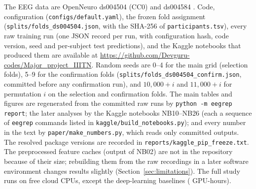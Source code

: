 \begin{sloppypar}
The EEG data are OpenNeuro ds004504 (CC0) \cite{ds004504} and ds004584 \cite{ds004584}. Code, configuration
(\texttt{configs/default.yaml}), the frozen fold assignment (\texttt{splits/folds\_ds004504.json},
with the SHA-256 of \texttt{participants.tsv}), every raw training run (one JSON record per run,
with configuration hash, code version, seed and per-subject test predictions), and the Kaggle
notebooks that produced them are available at
\url{https://github.com/Devguru-codes/Major_project_IIITN}. Random seeds are 0--4 for the main grid
(selection folds), 5--9 for the confirmation folds (\texttt{splits/folds\_ds004504\_confirm.json},
committed before any confirmation run), and $10{,}000+i$ and $11{,}000+i$ for permutation $i$ on the
selection and confirmation folds. The main tables and figures are regenerated from the committed raw runs
by \texttt{python -m eegrep report}; the later analyses by the Kaggle notebooks NB10--NB26 (each a sequence of
\texttt{eegrep} commands listed in \texttt{kaggle/build\_notebooks.py}); and every number in the text by
\texttt{paper/make\_numbers.py}, which reads only committed outputs. The resolved package versions are
recorded in \texttt{reports/kaggle\_pip\_freeze.txt}. The preprocessed feature caches (output of NB02) are not in the repository because of their size; rebuilding them from the raw recordings in a later software environment changes results slightly (Section~\ref{sec:limitations}). The full study
runs on free cloud CPUs, except the deep-learning baselines (\gpuHoursTotal{} GPU-hours).
\end{sloppypar}
